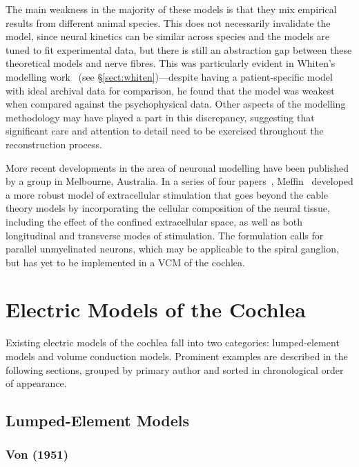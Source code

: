 The main weakness in the majority of these models is that they mix empirical
results from different animal species. This does not necessarily invalidate the
model, since neural kinetics can be similar across species and the models are
tuned to fit experimental data, but there is still an abstraction gap between
these theoretical models and \insitu{} nerve fibres. This was particularly
evident in Whiten's modelling work~\cite{whiten2007} (see
\S\ref{sect:whiten})---despite having a patient-specific model with ideal
archival data for comparison, he found that the model was weakest when compared
against the psychophysical data. Other aspects of the modelling methodology may
have played a part in this discrepancy, suggesting that significant care and
attention to detail need to be exercised throughout the reconstruction process.

More recent developments in the area of neuronal modelling have been published
by a group in Melbourne, Australia. In a series of four
papers~\cite{meffin2012,tahayori2012,meffin2014,tahayori2014}, Meffin~\etal{}
developed a more robust model of extracellular stimulation that goes beyond the
cable theory models by incorporating the cellular composition of the neural
tissue, including the effect of the confined extracellular space, as well as
both longitudinal and transverse modes of stimulation. The formulation
calls for parallel unmyelinated neurons, which may be applicable to the
spiral ganglion, but has yet to be implemented in a VCM of the cochlea.

\section{Electric Models of the Cochlea}

Existing electric models of the cochlea fall into two categories: lumped-element
models and volume conduction models. Prominent examples are described in the
following sections, grouped by primary author and sorted in chronological order
of appearance.


\subsection{Lumped-Element Models}
\label{sect:lumped_element_models}

\subsubsection{Von \bekesy{} (1951)}

